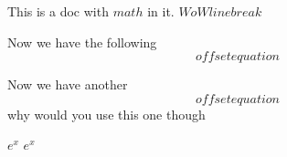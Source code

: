 

This is a doc with \(math\) in it. $ W o
W linebreak $

Now we have the following \[ offset equation \]

Now we have another $$
offset equation
$$ why would you use this one though

$  e^x$
$  e^x  $


